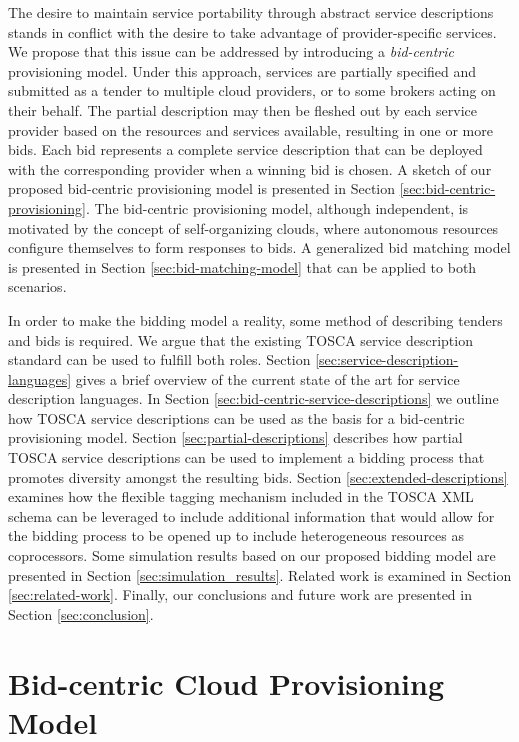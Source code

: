 \documentclass[10pt, conference, compsocconf]{IEEEtran}
\begin{document}
The desire to maintain service portability through abstract service descriptions stands in conflict with the desire to take advantage of provider-specific services. We propose that this issue can be addressed by introducing a \textit{bid-centric} provisioning model. Under this approach, services are partially specified and submitted as a tender to multiple cloud providers, or to some brokers acting on their behalf. The partial description may then be fleshed out by each service provider based on the resources and services available, resulting in one or more bids. Each bid represents a complete service description that can be deployed with the corresponding provider when a winning bid is chosen. A sketch of our proposed bid-centric provisioning model is presented in Section \ref{sec:bid-centric-provisioning}. The bid-centric provisioning model, although independent, is motivated by the concept of self-organizing clouds, where autonomous resources configure themselves to form responses to bids. A generalized bid matching model is presented in Section \ref{sec:bid-matching-model} that can be applied to both scenarios.

In order to make the bidding model a reality, some method of describing tenders and bids is required. We argue that the existing TOSCA service description standard can be used to fulfill both roles. Section \ref{sec:service-description-languages} gives a brief overview of the current state of the art for service description languages. In Section \ref{sec:bid-centric-service-descriptions} we outline how TOSCA service descriptions can be used as the basis for a bid-centric provisioning model. Section \ref{sec:partial-descriptions} describes how partial TOSCA service descriptions can be used to implement a bidding process that promotes diversity amongst the resulting bids. Section \ref{sec:extended-descriptions} examines how the flexible tagging mechanism included in the TOSCA XML schema can be leveraged to include additional information that would allow for the bidding process to be opened up to include heterogeneous resources as coprocessors. Some simulation results based on our proposed bidding model are presented in Section \ref{sec:simulation_results}. Related work is examined in Section \ref{sec:related-work}. Finally, our conclusions and future work are presented in Section \ref{sec:conclusion}.



\section{Bid-centric Cloud Provisioning Model}
\end{document}
